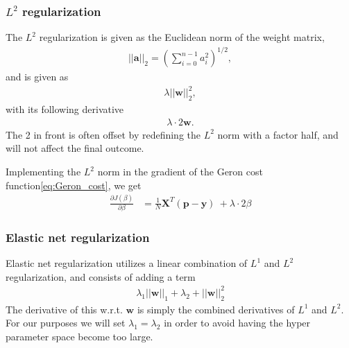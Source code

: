 \subsubsection{\texorpdfstring{$L^2$}{L2} regularization}
The $L^2$ regularization is given as the Euclidean norm of the weight matrix,
\begin{align}
    ||\bm{a}||_2 = \left(\sum^{n-1}_{i=0} a_i^2 \right)^{1/2},
\end{align}
and is given as
\begin{align}
    \lambda||\bm{w}||^2_2,
    \label{eq:l2-reg}
\end{align}
with its following derivative
\begin{align}
    \lambda\cdot{2\bm{w}}.
    \label{eq:l2-reg-derivative}
\end{align}
The 2 in front is often offset by redefining the $L^2$ norm with a factor half, and will not affect the final outcome.

Implementing the $L^2$ norm in the gradient of the Geron cost function\eqref{eq:Geron_cost}, we get
\begin{align}
    \frac{\partial J(\beta)}{\partial \beta} &=\frac{1}{N}\bm{X}^T(\bm{p}-\bm{y})\ + \lambda\cdot{2\beta}
    \label{eq:geron-cost-l2}
\end{align}

\subsubsection{Elastic net regularization}
Elastic net regularization utilizes a linear combination of $L^1$ and $L^2$ regularization, and consists of adding a term
\begin{align}
    \lambda_1 ||\bm{w}||_1 + \lambda_2 + ||\bm{w}||_2^2
    \label{eq:elastic_net}
\end{align}
The derivative of this w.r.t. $\bm{w}$ is simply the combined derivatives of $L^1$ and $L^2$. For our purposes we will set $\lambda_1=\lambda_2$ in order to avoid having the hyper parameter space become too large.